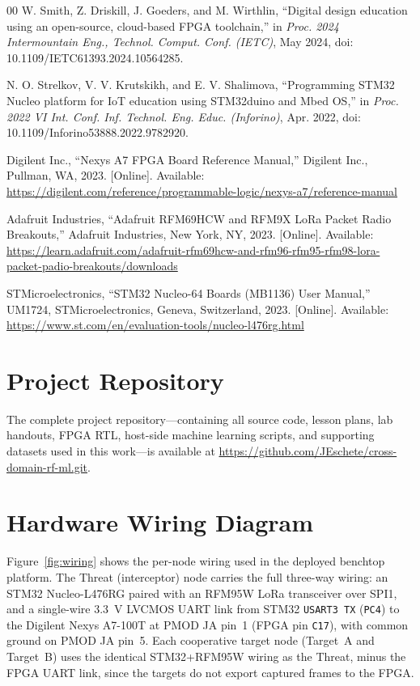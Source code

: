 \documentclass[conference]{IEEEtran}
\begin{document}
\begin{thebibliography}{00}
W. Smith, Z. Driskill, J. Goeders, and M. Wirthlin, ``Digital design education using an open-source, cloud-based FPGA toolchain,'' in \textit{Proc. 2024 Intermountain Eng., Technol. Comput. Conf. (IETC)}, May 2024, doi: 10.1109/IETC61393.2024.10564285. %

N. O. Strelkov, V. V. Krutskikh, and E. V. Shalimova, ``Programming STM32 Nucleo platform for IoT education using STM32duino and Mbed OS,'' in \textit{Proc. 2022 VI Int. Conf. Inf. Technol. Eng. Educ. (Inforino)}, Apr. 2022, doi: 10.1109/Inforino53888.2022.9782920. %

Digilent Inc., ``Nexys A7 FPGA Board Reference Manual,'' Digilent Inc., Pullman, WA, 2023. [Online]. Available: \url{https://digilent.com/reference/programmable-logic/nexys-a7/reference-manual} %

Adafruit Industries, ``Adafruit RFM69HCW and RFM9X LoRa Packet Radio Breakouts,'' Adafruit Industries, New York, NY, 2023. [Online]. Available: \url{https://learn.adafruit.com/adafruit-rfm69hcw-and-rfm96-rfm95-rfm98-lora-packet-padio-breakouts/downloads} %

STMicroelectronics, ``STM32 Nucleo-64 Boards (MB1136) User Manual,'' UM1724, STMicroelectronics, Geneva, Switzerland, 2023. [Online]. Available: \url{https://www.st.com/en/evaluation-tools/nucleo-l476rg.html} %

\end{thebibliography}

\appendices

\section{Project Repository}\label{app:repo}

The complete project repository---containing all source code, lesson plans, lab handouts, FPGA RTL, host-side machine learning scripts, and supporting datasets used in this work---is available at \url{https://github.com/JEschete/cross-domain-rf-ml.git}.

\section{Hardware Wiring Diagram}\label{app:wiring}

Figure~\ref{fig:wiring} shows the per-node wiring used in the deployed benchtop platform. The Threat (interceptor) node carries the full three-way wiring: an STM32 Nucleo-L476RG paired with an RFM95W LoRa transceiver over SPI1, and a single-wire 3.3~V LVCMOS UART link from STM32 \texttt{USART3 TX} (\texttt{PC4}) to the Digilent Nexys A7-100T at PMOD JA pin~1 (FPGA pin \texttt{C17}), with common ground on PMOD JA pin~5. Each cooperative target node (Target~A and Target~B) uses the identical STM32+RFM95W wiring as the Threat, minus the FPGA UART link, since the targets do not export captured frames to the FPGA.
\end{document}
